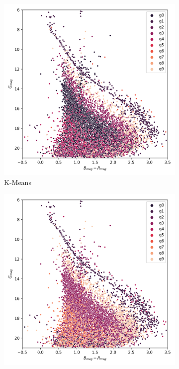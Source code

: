 \documentclass[preprint,12pt,authoryear]{elsarticle}
\begin{document}
\begin{figure}[!hbt]
  \begin{subfigure}{0.29\textwidth}
    \includegraphics[width=\textwidth]{../figures/ngc_2632/kmeans_hr_diagram_ngc_2632.png}
    \caption{K-Means}
  \end{subfigure}
  \begin{subfigure}{0.29\textwidth}
    \includegraphics[width=\textwidth]{../figures/ngc_2632/dec_hr_diagram_ngc_2632.png}

\end{subfigure}
\end{figure}
\end{document}
